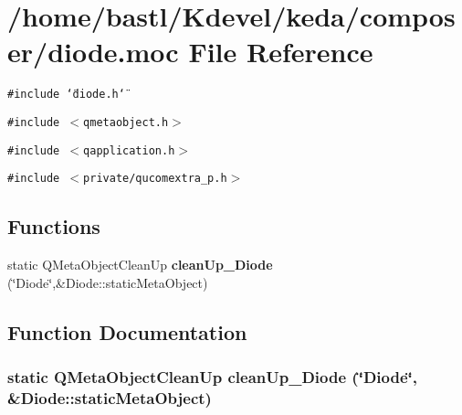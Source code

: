 \section{/home/bastl/Kdevel/keda/composer/diode.moc File Reference}
\label{diode_8moc}
{\tt \#include \char`\"{}diode.h\char`\"{}}\par
{\tt \#include $<$qmetaobject.h$>$}\par
{\tt \#include $<$qapplication.h$>$}\par
{\tt \#include $<$private/qucomextra\_\-p.h$>$}\par
\subsection*{Functions}
\begin{CompactItemize}
\item 
static QMeta\-Object\-Clean\-Up {\bf clean\-Up\_\-Diode} (\char`\"{}Diode\char`\"{},\&Diode::static\-Meta\-Object)
\end{CompactItemize}


\subsection{Function Documentation}
\subsubsection{\setlength{\rightskip}{0pt plus 5cm}static QMeta\-Object\-Clean\-Up clean\-Up\_\-Diode (\char`\"{}Diode\char`\"{}, \&Diode::static\-Meta\-Object)\hspace{0.3cm}{\tt  [static]}}\label{diode_8moc_7950dd53027f7834eba7911d0534007f}


